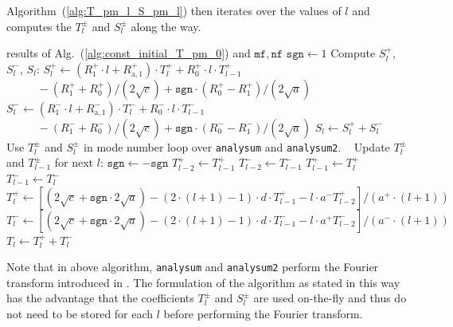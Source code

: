 Algorithm~(\ref{alg:T_pm_l_S_pm_l}) then iterates over the values of $l$ and computes the $T^{\pm}_l$ and $S^{\pm}_l$ along the way.
\begin{algorithm}
\caption{Calculate $T^{\pm}_l$ and $S^{\pm}_l$ for all $l$}
\label{alg:T_pm_l_S_pm_l}
\begin{algorithmic}
\Require results of Alg.~(\ref{alg:const_initial_T_pm_0}) and $\mathtt{mf}, \mathtt{nf}$
\State $\mathtt{sgn} \gets 1$
  \State Compute $S^{+}_l$, $S^{-}_l$, $S_l$:
  \State $         S^{+}_l \gets     \left( R^{+}_1 \cdot l + R^{+}_{\mathrm{a},1} \right) \cdot T^{+}_l + R^{+}_0 \cdot l \cdot T^{+}_{l-1}$
  \State $\phantom{S^{+}_l \gets } - \left( R^{+}_1 + R^{+}_0 \right)/\left(2\sqrt{c}\right) + \mathtt{sgn} \cdot \left( R^{+}_0 - R^{+}_1 \right)/\left(2\sqrt{a}\right)$
  \State $         S^{-}_l \gets     \left( R^{-}_1 \cdot l + R^{-}_{\mathrm{a},1} \right) \cdot T^{-}_l + R^{-}_0 \cdot l \cdot T^{-}_{l-1}$
  \State $\phantom{S^{-}_l \gets } - \left( R^{-}_1 + R^{-}_0 \right)/\left(2\sqrt{c}\right) + \mathtt{sgn} \cdot \left( R^{-}_0 - R^{-}_1 \right)/\left(2\sqrt{a}\right)$
  \State $S_l \gets S^{+}_l + S^{-}_l$
  \State ~
  \State Use $T^{\pm}_l$ and $S^{\pm}_l$ in mode number loop over \texttt{analysum} and \texttt{analysum2}.
  \State ~
  \State Update $T^{\pm}_l$ and $T^{\pm}_{l-1}$ for next $l$:
  \State $\mathtt{sgn} \gets -\mathtt{sgn}$
  \State $T^{+}_{l-2} \gets T^{+}_{l-1}$
  \State $T^{-}_{l-2} \gets T^{-}_{l-1}$
  \State $T^{+}_{l-1} \gets T^{+}_l$
  \State $T^{-}_{l-1} \gets T^{-}_l$
  \State $T^{+}_l \gets \left[ \left( 2\sqrt{c} + \mathtt{sgn} \cdot 2\sqrt{a} \right) - (2\cdot (l+1)-1) \cdot d \cdot T^{+}_{l-1} - l \cdot a^{-} T^{+}_{l-2} \right]/\left( a^{+} \cdot (l+1) \right)$
  \State $T^{-}_l \gets \left[ \left( 2\sqrt{c} + \mathtt{sgn} \cdot 2\sqrt{a} \right) - (2\cdot (l+1)-1) \cdot d \cdot T^{-}_{l-1} - l \cdot a^{+} T^{-}_{l-2} \right]/\left( a^{-} \cdot (l+1) \right)$
  \State $T_l \gets T^{+}_l + T^{-}_l$
\EndFor
\end{algorithmic}
\end{algorithm}
Note that in above algorithm,
\texttt{analysum} and \texttt{analysum2} perform the Fourier transform introduced in .
The formulation of the algorithm as stated in this way
has the advantage that the coefficients $T^\pm_l$ and $S^\pm_l$ are used on-the-fly
and thus do not need to be stored for each $l$ before performing the Fourier transform.

\FloatBarrier
